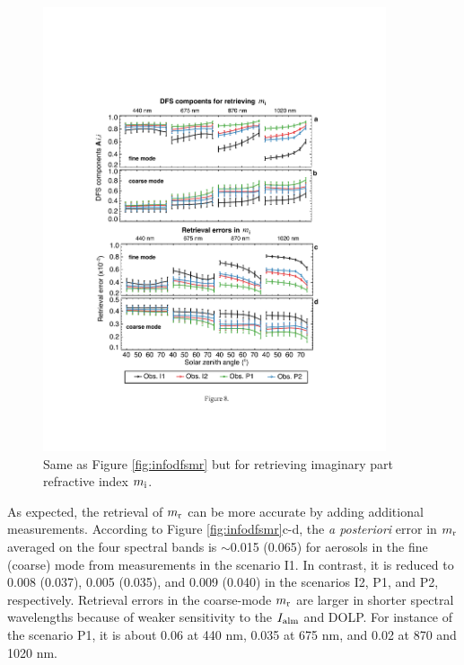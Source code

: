 \begin{figure}[p]
  \centering
  \includegraphics[width={0.9\textwidth}]{figures/info08.pdf}
  \caption{Same as Figure \ref{fig:infodfsmr} but for retrieving imaginary 
part refractive index $m_\text{i}$.}
  \label{fig:infodfsmi}
\end{figure}

As expected, the retrieval of $m_\text{r}$ can be more accurate by adding additional
measurements. According to Figure \ref{fig:infodfsmr}c-d, the \textit{a
posteriori} error in $m_\text{r}$ averaged on the four spectral bands is 
$\sim$0.015 (0.065) for aerosols in the fine (coarse) mode from measurements
in the scenario I1. In contrast, it is reduced to 0.008 (0.037), 0.005 (0.035), 
and 0.009 (0.040) in the scenarios I2, P1, and P2, respectively. 
Retrieval errors in the coarse-mode $m_\text{r}$ are larger in shorter
spectral wavelengths because of weaker sensitivity to the $I_\text{alm}$ and DOLP. 
For instance of the scenario P1, it is about 0.06 at 440 nm, 0.035 at 675 nm, 
and 0.02 at 870 and 1020 nm. 


